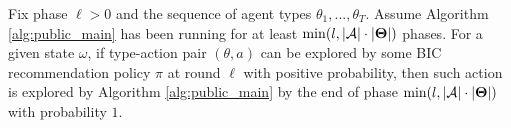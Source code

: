 

\begin{lemma}
\label{lem:exp_public}
Fix phase $\ell>0$ and the sequence of agent types $\theta_1,...,\theta_T$. Assume Algorithm \ref{alg:public_main} has been running for at least $\min(l, |\mathcal{A}|\cdot |\bold{\Theta}|)$ phases.
For a given state $\omega$, if type-action pair $(\theta,a)$ can be explored by some BIC recommendation policy $\pi$ at round $\ell$ with positive probability, then such action is explored by Algorithm \ref{alg:public_main} by the end of phase $\min(l, |\mathcal{A}|\cdot |\bold{\Theta}|)$ with probability $1$.
\end{lemma}

